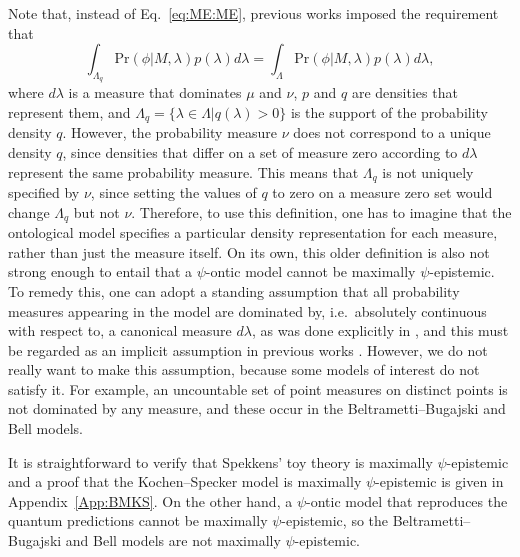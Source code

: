 \documentclass[DIV=calc,paper=a4,fontsize=11pt,twocolumn]{scrartcl} %
\theoremstyle{definition}
\theoremstyle{plain}
\begin{document}
Note that, instead of Eq.~\eqref{eq:ME:ME}, previous works
\cite{Harrigan2007, Maroney2012, Maroney2012a, Leifer2013c} imposed
the requirement that
\begin{equation}
\label{eq:ME:MEold}
\int_{\Lambda_{q}} \text{Pr}(\phi|M,\lambda)p(\lambda) d\lambda =
\int_{\Lambda} \text{Pr}(\phi|M,\lambda)p(\lambda) d\lambda,
\end{equation}
where $d\lambda$ is a measure that dominates $\mu$ and $\nu$, $p$ and
$q$ are densities that represent them, and $\Lambda_{q} = \{\lambda
\in \Lambda | q(\lambda) > 0\}$ is the support of the probability
density $q$.  However, the probability measure $\nu$ does not
correspond to a unique density $q$, since densities that differ on a
set of measure zero according to $d \lambda$ represent the same
probability measure.  This means that $\Lambda_q$ is not uniquely
specified by $\nu$, since setting the values of $q$ to zero on a
measure zero set would change $\Lambda_q$ but not $\nu$.  Therefore,
to use this definition, one has to imagine that the ontological model
specifies a particular density representation for each measure, rather
than just the measure itself.  On its own, this older definition is
also not strong enough to entail that a $\psi$-ontic model cannot be
maximally $\psi$-epistemic.  To remedy this, one can adopt a standing
assumption that all probability measures appearing in the model are
dominated by, i.e.\ absolutely continuous with respect to, a canonical
measure $d\lambda$, as was done explicitly in \cite{Leifer2013c}, and
this must be regarded as an implicit assumption in previous works
\cite{Harrigan2007, Maroney2012, Maroney2012a}.  However, we do not
really want to make this assumption, because some models of interest
do not satisfy it.  For example, an uncountable set of point measures
on distinct points is not dominated by any measure, and these occur in
the Beltrametti--Bugajski and Bell models.

It is straightforward to verify that Spekkens' toy theory is maximally
$\psi$-epistemic and a proof that the Kochen--Specker model is
maximally $\psi$-epistemic is given in Appendix~\ref{App:BMKS}.  On
the other hand, a $\psi$-ontic model that reproduces the quantum
predictions cannot be maximally $\psi$-epistemic, so the
Beltrametti--Bugajski and Bell models are not maximally
$\psi$-epistemic.
\end{document}
